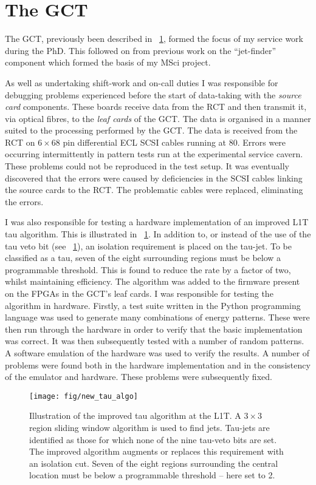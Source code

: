 \section{The \acl{GCT}}
\label{sec:l1t}
The \ac{GCT}, previously been described in \sec~\ref{sec:l1t}, formed the focus
of my service work during the PhD. This followed on from previous work on the
``jet-finder'' component which formed the basis of my MSci project.

As well as undertaking shift-work and on-call duties I was responsible for
debugging problems experienced before the start of data-taking with the
\emph{source card} components. These boards receive data from the \ac{RCT} and
then transmit it, via optical fibres, to the \emph{leaf cards} of the
\ac{GCT}. The data is organised in a manner suited to the processing performed
by the \ac{GCT}. The data is received from the \ac{RCT} on $6\times 68$ pin
differential \ac{ECL} \ac{SCSI} cables running at \unit{80}{\mega\hertz}. Errors
were occurring intermittently in pattern tests run at the experimental service
cavern. These problems could not be reproduced in the test setup. It was
eventually discovered that the errors were caused by deficiencies in the
\ac{SCSI} cables linking the source cards to the \ac{RCT}. The problematic
cables were replaced, eliminating the errors.

I was also responsible for testing a hardware implementation of an improved
\ac{L1T} tau algorithm. This is illustrated in \fig~\ref{fig:l1t_tau_algo}. In
addition to, or instead of the use of the tau veto bit (see \sec~\ref{sec:l1t}),
an isolation requirement is placed on the tau-jet. To be classified as a tau,
seven of the eight surrounding regions must be below a programmable
threshold. This is found to reduce the rate by a factor of two, whilst
maintaining efficiency. The algorithm was added to the firmware present on the
\acp{FPGA} in the \ac{GCT}'s leaf cards. I was responsible for testing the
algorithm in hardware. Firstly, a test suite written in the Python programming
language was used to generate many combinations of energy patterns. These were
then run through the hardware in order to verify that the basic implementation
was correct. It was then subsequently tested with a number of random patterns. A
software emulation of the hardware was used to verify the results. A number of
problems were found both in the hardware implementation and in the consistency
of the emulator and hardware. These problems were subsequently fixed.

\begin{figure}
\centering
\texttt{[image: fig/new\_tau\_algo]}
\caption[]{Illustration of the improved tau algorithm at the \ac{L1T}. A
  $3\times 3$ region sliding window algorithm is used to find jets. Tau-jets are
  identified as those for which none of the nine tau-veto bits are set. The
  improved algorithm augments or replaces this requirement with an isolation
  cut. Seven of the eight regions surrounding the central location must be below
  a programmable threshold -- here set to \unit{2}{\GeV}.}
\label{fig:l1t_tau_algo}
\end{figure}
